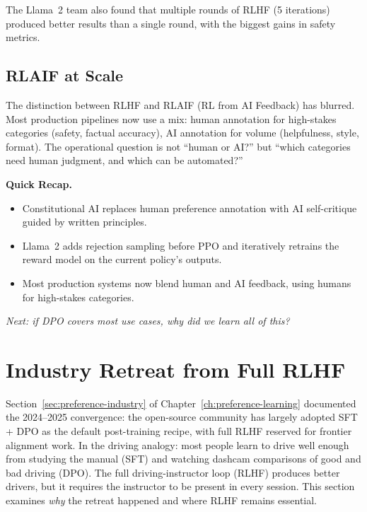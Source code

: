 The Llama~2 team also found that multiple rounds of RLHF (5 iterations) produced better results than a single round, with the biggest gains in safety metrics.

\subsection{RLAIF at Scale}

The distinction between RLHF and RLAIF (RL from AI Feedback) has blurred. Most production pipelines now use a mix: human annotation for high-stakes categories (safety, factual accuracy), AI annotation for volume (helpfulness, style, format). The operational question is not ``human or AI?'' but ``which categories need human judgment, and which can be automated?''

\begin{quickrecap}
\textbf{Quick Recap.}
\begin{itemize}[nosep,leftmargin=1.5em]
  \item Constitutional AI replaces human preference annotation with AI self-critique guided by written principles.
  \item Llama~2 adds rejection sampling before PPO and iteratively retrains the reward model on the current policy's outputs.
  \item Most production systems now blend human and AI feedback, using humans for high-stakes categories.
\end{itemize}
\textit{Next: if DPO covers most use cases, why did we learn all of this?}
\end{quickrecap}


\section{Industry Retreat from Full RLHF}
\label{sec:rlhf-retreat}

Section~\ref{sec:preference-industry} of Chapter~\ref{ch:preference-learning} documented the 2024--2025 convergence: the open-source community has largely adopted SFT + DPO as the default post-training recipe, with full RLHF reserved for frontier alignment work. In the driving analogy: most people learn to drive well enough from studying the manual (SFT) and watching dashcam comparisons of good and bad driving (DPO). The full driving-instructor loop (RLHF) produces better drivers, but it requires the instructor to be present in every session. This section examines \emph{why} the retreat happened and where RLHF remains essential.


